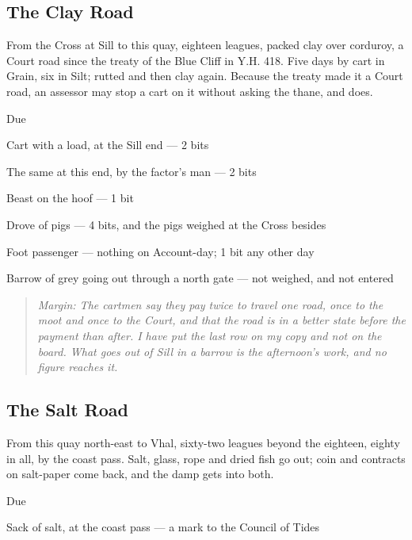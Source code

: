 \documentclass{design/chronicle}
\begin{document}
\subsection*{The Clay Road}

From the Cross at Sill to this quay, eighteen leagues, packed clay over corduroy, a Court road since the treaty of the Blue Cliff in Y.H. 418. Five days by cart in Grain, six in Silt; rutted and then clay again. Because the treaty made it a Court road, an assessor may stop a cart on it without asking the thane, and does.

Due\par

Cart with a load, at the Sill end — 2 bits\par

The same at this end, by the factor’s man — 2 bits\par

Beast on the hoof — 1 bit\par

Drove of pigs — 4 bits, and the pigs weighed at the Cross besides\par

Foot passenger — nothing on Account-day; 1 bit any other day\par

Barrow of grey going out through a north gate — not weighed, and not entered\par

\begin{quote}\itshape \emph{Margin:} The cartmen say they pay twice to travel one road, once to the moot and once to the Court, and that the road is in a better state before the payment than after. I have put the last row on my copy and not on the board. What goes out of Sill in a barrow is the afternoon’s work, and no figure reaches it.\end{quote}

\subsection*{The Salt Road}

From this quay north-east to Vhal, sixty-two leagues beyond the eighteen, eighty in all, by the coast pass. Salt, glass, rope and dried fish go out; coin and contracts on salt-paper come back, and the damp gets into both.

Due\par

Sack of salt, at the coast pass — a mark to the Council of Tides\par
\end{document}
